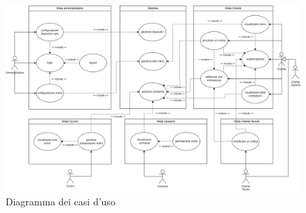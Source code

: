 \begin{figure}[htbp]

	\centering
	
	
	\includegraphics[scale=0.32]{iterazione0/images/use_cases_diagram}
	\caption{Diagramma dei casi d'uso\label{fig:use_cases_diagram}}
\end{figure}

\clearpage